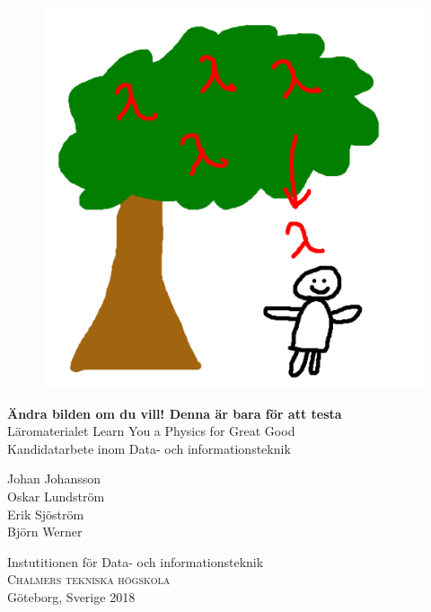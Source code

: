 
\begin{titlepage}

\addtolength{\voffset}{2cm}

\begin{figure}[H]
\centering
\vspace{0cm}	%
\includegraphics[width=0.7\linewidth]{figure/Framsida.png}
\end{figure}

\renewcommand{\familydefault}{\sfdefault} \normalfont %
\vfill
\textbf{{\Huge  Ändra bilden om du vill! Denna är bara för att testa}} 	\\[0.5cm]
{\Large Läromaterialet Learn You a Physics for Great Good}\\[0.5cm]
Kandidatarbete inom Data- och informationsteknik
\setlength{\parskip}{1cm}

{\Large Johan Johansson \\[0.3cm]
Oskar Lundström \\[0.3cm]
Erik Sjöström \\[0.2cm]
Björn Werner \\[0.2cm]}

Instutitionen för Data- och informationsteknik \\
\textsc{Chalmers tekniska högskola} \\
Göteborg, Sverige 2018

\renewcommand{\familydefault}{\rmdefault} \normalfont %
\end{titlepage}


